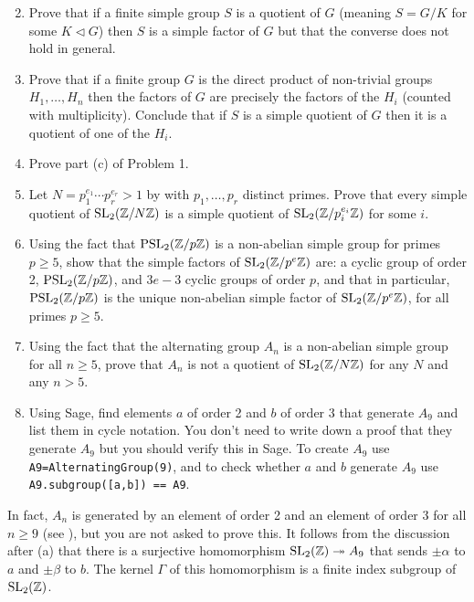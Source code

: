 \documentclass[11pt]{article}
\newcommand{\Z}{\mathbb{Z}}
\newcommand{\SL}{{\rm SL}}
\newcommand{\PSL}{{\rm PSL}}
\theoremstyle{definition}
\begin{document}
\begin{enumerate}[{\bf(a)}]
\setcounter{enumi}{1}
\item
Prove that if a finite simple group $S$ is a quotient of $G$ (meaning $S=G/K$ for some $K\triangleleft G$) then $S$ is a simple factor of $G$ but that the converse does not hold in general.
\item
Prove that if a finite group $G$ is the direct product of non-trivial groups $H_1,\ldots, H_n$ then the factors of $G$ are precisely the factors of the $H_i$ (counted with multiplicity).
Conclude that if $S$ is a simple quotient of $G$ then it is a quotient of one of the $H_i$.
\item
Prove part (c) of Problem 1.
\item
Let $N=p_1^{e_1}\cdots p_r^{e_r} > 1$ by with $p_1,\ldots,p_r$ distinct primes.  Prove that every simple quotient of $\SL_2(\Z/N\Z)$ is a simple quotient of $\SL_2(\Z/p_i^{e_i}\Z)$ for some $i$.
\item
Using the fact that $\PSL_2(\Z/p\Z)$ is a non-abelian simple group for primes $p\ge 5$, show that the simple factors of $\SL_2(\Z/p^e\Z)$ are: a cyclic group of order 2, $\PSL_2(\Z/p\Z)$, and $3e-3$ cyclic groups of order $p$, and that in particular, $\PSL_2(\Z/p\Z)$ is the unique non-abelian simple factor of $\SL_2(\Z/p^e\Z)$, for all primes $p\ge 5$.
\item
Using the fact that the alternating group $A_n$ is a non-abelian simple group for all $n\ge 5$, prove that $A_n$ is not a quotient of $\SL_2(\Z/N\Z)$ for any $N$ and any $n>5$.
\item
Using Sage, find elements $a$ of order 2 and $b$ of order 3 that generate $A_9$ and list them in cycle notation.
You don't need to write down a proof that they generate $A_9$ but you should verify this in Sage.
To create $A_9$ use \texttt{A9=AlternatingGroup(9)}, and to check whether $a$ and $b$ generate $A_9$ use \texttt{A9.subgroup([a,b]) == A9}.
\end{enumerate}
In fact, $A_n$ is generated by an element of order 2 and an element of order 3 for all $n\ge 9$ (see \cite{dw}), but you are not asked to prove this.
It follows from the discussion after (a) that there is a surjective homomorphism $\SL_2(\Z)\twoheadrightarrow A_9$ that sends $\pm \alpha$ to $a$ and $\pm \beta$ to $b$.
The kernel $\Gamma$ of this homomorphism is a finite index subgroup of $\SL_2(\Z)$.
\end{document}
